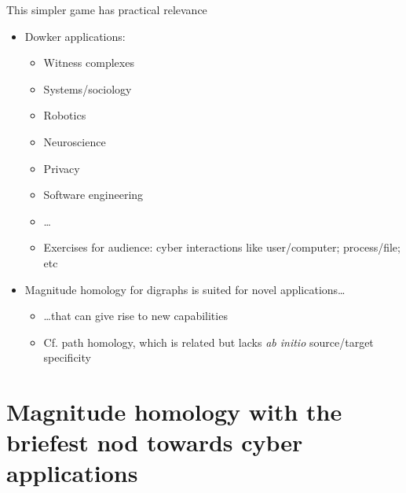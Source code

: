 \documentclass[usenames,dvipsnames,10pt,aspectratio=169]{beamer}
\begin{document}
\begin{frame}{This simpler game has practical relevance}
	\begin{itemize}
		\item<1-> Dowker applications:
		\begin{itemize}
			\item<1-> Witness complexes
			\item<1-> Systems/sociology
			\item<1-> Robotics
			\item<1-> Neuroscience
			\item<1-> Privacy
			\item<1-> Software engineering 
			\item<1-> \dots
			\item<1-> Exercises for audience: cyber interactions like user/computer; process/file; etc
		\end{itemize}
		\item<2-> Magnitude homology for digraphs is suited for novel applications\dots
		\begin{itemize}
			\item<2-> \dots that can give rise to new capabilities
			\item<3-> Cf. path homology, which is related but lacks \emph{ab initio} source/target specificity
		\end{itemize}
	\end{itemize}
\end{frame}


\section{{\bf Magnitude homology} with the briefest nod towards cyber applications}
\end{document}
